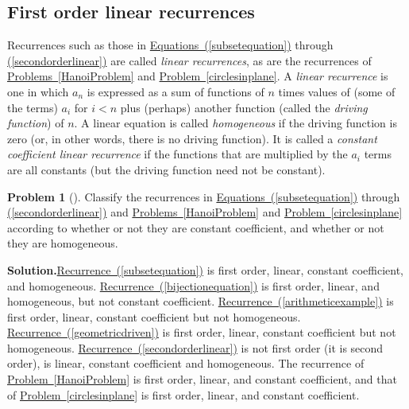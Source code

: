 \documentclass[10pt,]{book}
\theoremstyle{plain}
\theoremstyle{definition}
\newtheorem{activity}[project]{Problem}
\theoremstyle{definition}
\numberwithin{equation}{chapter}
\newcommand{\lt}{<}
\begin{document}
\subsection[{First order linear recurrences}]{First order linear recurrences}\label{subsection-13}
Recurrences such as those in \hyperref[subsetequation]{Equations~(\ref{subsetequation})} through \hyperref[secondorderlinear]{(\ref{secondorderlinear})} are called \emph{linear recurrences}, as are the recurrences of \hyperref[HanoiProblem]{Problems~\ref{HanoiProblem}} and \hyperref[circlesinplane]{Problem~\ref{circlesinplane}}. A \emph{linear recurrence} is one in which \(a_n\) is expressed as a sum of functions of \(n\) times values of (some of the terms) \(a_i\) for \(i\lt n\) plus (perhaps) another function (called the \emph{driving function}) of \(n\). A linear equation is called \emph{homogeneous} if the driving function is zero (or, in other words, there is no driving function). It is called a \emph{constant coefficient linear recurrence} if the functions that are multiplied by the \(a_i\) terms are all constants (but the driving function need not be constant).%
\begin{activity}[]\label{classifyrecurrences}
Classify the recurrences in \hyperref[subsetequation]{Equations~(\ref{subsetequation})} through \hyperref[secondorderlinear]{(\ref{secondorderlinear})} and \hyperref[HanoiProblem]{Problems~\ref{HanoiProblem}} and \hyperref[circlesinplane]{Problem~\ref{circlesinplane}} according to whether or not they are constant coefficient, and whether or not they are homogeneous.%
\par\medskip\noindent%
\textbf{Solution.}\quad \hyperref[subsetequation]{Recurrence~(\ref{subsetequation})} is first order, linear, constant coefficient, and homogeneous. \hyperref[bijectionequation]{Recurrence~(\ref{bijectionequation})} is first order, linear, and homogeneous, but not constant coefficient. \hyperref[arithmeticexample]{Recurrence~(\ref{arithmeticexample})} is first order, linear, constant coefficient but not homogeneous. \hyperref[geometricdriven]{Recurrence~(\ref{geometricdriven})} is first order, linear, constant coefficient but not homogeneous. \hyperref[secondorderlinear]{Recurrence~(\ref{secondorderlinear})} is not first order (it is second order), is linear, constant coefficient and homogeneous. The recurrence of \hyperref[HanoiProblem]{Problem~\ref{HanoiProblem}} is first order, linear, and constant coefficient, and that of \hyperref[circlesinplane]{Problem~\ref{circlesinplane}} is first order, linear, and constant coefficient.%
\end{activity}
\end{document}
